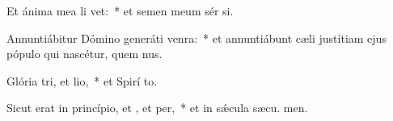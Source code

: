 \item Et ánima mea li vet:~* et semen meum sér si.
\item Annuntiábitur Dómino generáti venra:~* et annuntiábunt cæli justítiam ejus pópulo qui nascétur, quem  nus.
\item Glória tri, et lio,~* et Spirí to.
\item Sicut erat in princípio, et , et per,~* et in sǽcula sæcu. men.
